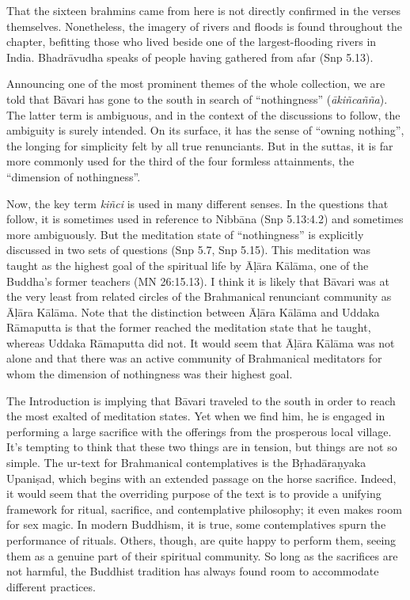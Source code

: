 \documentclass[12pt,openany]{book}%
\begin{document}
That the sixteen brahmins came from here is not directly confirmed in the verses themselves. Nonetheless, the imagery of rivers and floods is found throughout the chapter, befitting those who lived beside one of the largest-flooding rivers in India. \textsanskrit{Bhadrāvudha} speaks of people having gathered from afar (Snp 5.13).

Announcing one of the most prominent themes of the whole collection, we are told that \textsanskrit{Bāvari} has gone to the south in search of “nothingness” (\textit{\textsanskrit{ākiñcañña}}). The latter term is ambiguous, and in the context of the discussions to follow, the ambiguity is surely intended. On its surface, it has the sense of “owning nothing”, the longing for simplicity felt by all true renunciants. But in the suttas, it is far more commonly used for the third of the four formless attainments, the “dimension of nothingness”.

Now, the key term \textit{\textsanskrit{kiñci}} is used in many different senses. In the questions that follow, it is sometimes used in reference to \textsanskrit{Nibbāna} (Snp 5.13:4.2) and sometimes more ambiguously. But the meditation state of “nothingness” is explicitly discussed in two sets of questions (Snp 5.7, Snp 5.15). This meditation was taught as the highest goal of the spiritual life by \textsanskrit{Āḷāra} \textsanskrit{Kālāma}, one of the Buddha’s former teachers (MN 26:15.13). I think it is likely that \textsanskrit{Bāvari} was at the very least from related circles of the Brahmanical renunciant community as \textsanskrit{Āḷāra} \textsanskrit{Kālāma}. Note that the distinction between \textsanskrit{Āḷāra} \textsanskrit{Kālāma} and Uddaka \textsanskrit{Rāmaputta} is that the former reached the meditation state that he taught, whereas Uddaka \textsanskrit{Rāmaputta} did not. It would seem that \textsanskrit{Āḷāra} \textsanskrit{Kālāma} was not alone and that there was an active community of Brahmanical meditators for whom the dimension of nothingness was their highest goal.

The Introduction is implying that \textsanskrit{Bāvari} traveled to the south in order to reach the most exalted of meditation states. Yet when we find him, he is engaged in performing a large sacrifice with the offerings from the prosperous local village. It’s tempting to think that these two things are in tension, but things are not so simple. The ur-text for Brahmanical contemplatives is the \textsanskrit{Bṛhadāraṇyaka} \textsanskrit{Upaniṣad}, which begins with an extended passage on the horse sacrifice. Indeed, it would seem that the overriding purpose of the text is to provide a unifying framework for ritual, sacrifice, and contemplative philosophy; it even makes room for sex magic. In modern Buddhism, it is true, some contemplatives spurn the performance of rituals. Others, though, are quite happy to perform them, seeing them as a genuine part of their spiritual community. So long as the sacrifices are not harmful, the Buddhist tradition has always found room to accommodate different practices.
\end{document}

